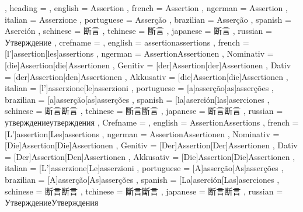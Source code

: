   {
    , heading =   {
                    , english     = Assertion
                    , french      = Assertion
                    , ngerman     = Assertion
                    , italian     = Asserzione
                    , portuguese  = Asserção
                    , brazilian   = Asserção
                    , spanish     = Aserción
                    , schinese    = 断言
                    , tchinese    = 斷言
                    , japanese    = 断言
                    , russian     = Утверждение
                  }
    , crefname =  {
                    , english     = {assertion}{assertions}
                    , french      = [l']{assertion}[les]{assertions}
                    , ngerman     = { {Assertion}{Assertionen}
                                      , Nominativ = [die]{Assertion}[die]{Assertionen}
                                      , Genitiv   = [der]{Assertion}[der]{Assertionen}
                                      , Dativ     = [der]{Assertion}[den]{Assertionen}
                                      , Akkusativ = [die]{Assertion}[die]{Assertionen}
                                    }
                    , italian     = [l']{asserzione}[le]{asserzioni}
                    , portuguese  = [a]{asserção}[as]{asserções}
                    , brazilian   = [a]{asserção}[as]{asserções}
                    , spanish     = [la]{aserción}[las]{aserciones}
                    , schinese    = {断言}{断言}
                    , tchinese    = {斷言}{斷言}
                    , japanese    = {断言}{断言}
                    , russian     = {утверждение}{утверждения}
                  }
    , Crefname =  {
                    , english     = {Assertion}{Assertions}
                    , french      = [L']{assertion}[Les]{assertions}
                    , ngerman     = { {Assertion}{Assertionen}
                                      , Nominativ = [Die]{Assertion}[Die]{Assertionen}
                                      , Genitiv   = [Der]{Assertion}[Der]{Assertionen}
                                      , Dativ     = [Der]{Assertion}[Den]{Assertionen}
                                      , Akkusativ = [Die]{Assertion}[Die]{Assertionen}
                                    }
                    , italian     = [L']{asserzione}[Le]{asserzioni}
                    , portuguese  = [A]{asserção}[As]{asserções}
                    , brazilian   = [A]{asserção}[As]{asserções}
                    , spanish     = [La]{aserción}[Las]{aserciones}
                    , schinese    = {断言}{断言}
                    , tchinese    = {斷言}{斷言}
                    , japanese    = {断言}{断言}
                    , russian     = {Утверждение}{Утверждения}
                  }
  }

